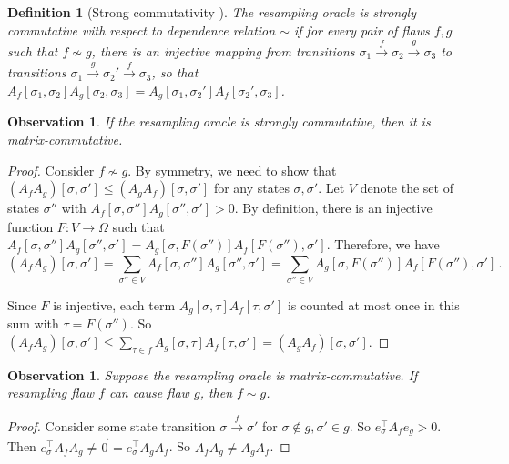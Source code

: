 \documentclass[11pt]{article}
\newtheorem{definition}[theorem]{Definition}
\newtheorem{observation}[theorem]{Observation}
\begin{document}
\begin{definition}[Strong commutativity \cite{Kolmofocs}]\label{commutative_algos1}
The resampling oracle is \emph{strongly commutative} with respect to  dependence relation $\sim$ if  for every pair of flaws $f, g $ such that $f \nsim g$, there is an injective mapping from transitions $\sigma_1 \xrightarrow{f} \sigma_2 \xrightarrow{g}  \sigma_3$ to  transitions $\sigma_1 \xrightarrow{g} \sigma_2' \xrightarrow{f} \sigma_3$, so that  $A_f[\sigma_1,\sigma_2] A_g[\sigma_2, \sigma_3] = A_g[\sigma_1,\sigma_2'] A_f[\sigma_2',\sigma_3]$.
\end{definition}

\begin{observation}\label{implies_original} 
  If the resampling oracle is strongly commutative, then it is matrix-commutative.
\end{observation}
\begin{proof}

  Consider $f \not \sim g$. By symmetry, we need to show that $(A_f A_g)[ \sigma, \sigma'] \leq (A_g A_f)[ \sigma, \sigma']$ for any states $\sigma, \sigma'$.  Let $V$ denote the set of states $\sigma''$ with $A_f[\sigma, \sigma''] A_g[ \sigma'', \sigma'] > 0$. By definition, there is an injective function $F: V \rightarrow \Omega$ such that $A_f[\sigma,\sigma''] A_g[\sigma'', \sigma'] = A_g[\sigma,F(\sigma'')] A_f[F(\sigma''),\sigma']$. Therefore, we have
  $$
  (A_f A_g) [ \sigma, \sigma' ] = \sum_{\sigma'' \in V} A_f[\sigma, \sigma''] A_g[\sigma'', \sigma'] = \sum_{\sigma'' \in V} A_g[\sigma,  F(\sigma'')] A_f[ F(\sigma''), \sigma' ]\,.
  $$

  Since $F$ is injective, each term $A_g[\sigma, \tau] A_f[ \tau, \sigma']$ is counted at most once in this sum with $\tau = F(\sigma'')$. So  $ (A_f A_g) [ \sigma, \sigma' ] \leq \sum_{\tau \in f} A_g[\sigma,\tau] A_f[ \tau, \sigma'] = (A_g A_f) [\sigma, \sigma']$.
  \end{proof}
  
 \begin{observation}
 \label{cause-obs}
 Suppose the resampling oracle is matrix-commutative. If resampling flaw $f$ can cause flaw $g$, then  $f \sim g$.
\end{observation}
\begin{proof}
Consider some state transition $\sigma \xrightarrow{f} \sigma'$ for $\sigma \notin g, \sigma' \in g$. So $e_{\sigma}^{\top} A_f e_g > 0$. Then  $e_{\sigma}^{\top} A_f A_g  \neq \vec 0 = e_{\sigma}^{\top} A_g A_f$. So $A_f A_g \neq A_g A_f$. 
\end{proof}
\end{document}
